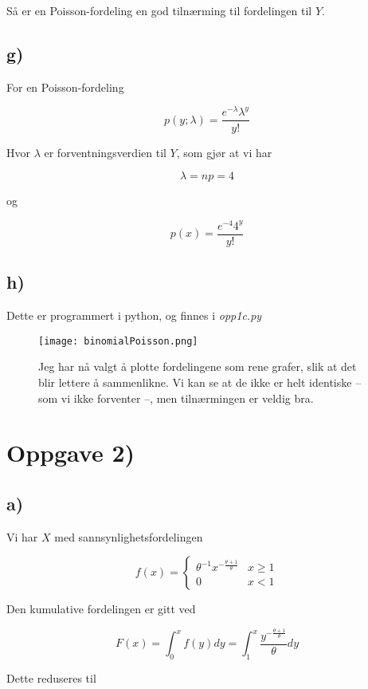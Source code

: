 \documentclass[a4paper,norsk, 10pt]{article}
\begin{document}
Så er en Poisson-fordeling en god tilnærming til fordelingen til $Y$.

\newpage
\subsection*{g)}

For en Poisson-fordeling 

$$
p(y;\lambda) = \frac{e^{-\lambda} \lambda^y}{y!}
$$

Hvor $\lambda$ er forventningsverdien til $Y$, som gjør at vi har

$$
\lambda = np = 4
$$

og 

$$
p(x) = \frac{e^{-4} 4^y}{y!}
$$


\subsection*{h)}

Dette er programmert i python, og finnes i \textit{opp1c.py}

\begin{figure}[H]
\centering
\texttt{[image: binomialPoisson.png]}
\caption{Jeg har nå valgt å plotte fordelingene som rene grafer, slik at det blir lettere å sammenlikne. Vi kan se at de ikke er helt identiske -- som vi ikke forventer --, men tilnærmingen er veldig bra.}
\end{figure}

\newpage

\section*{Oppgave 2)}

\subsection*{a)}

Vi har $X$ med sannsynlighetsfordelingen

$$
f(x) =
\begin{cases}
\theta^{-1}x^{-\frac{\theta+1}{\theta}} & x \geq 1\\
0 & x < 1
\end{cases}
$$

Den kumulative fordelingen er gitt ved

$$
F(x) = \int_0^x f(y) dy = \int_1^x \frac{y^{-\frac{\theta+1}{\theta}}}{\theta} dy 
$$

Dette reduseres til
\end{document}
